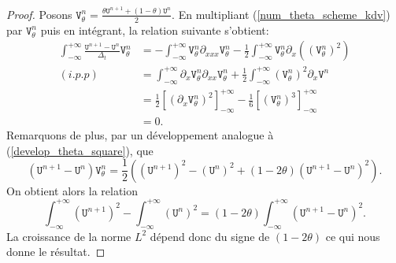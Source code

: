 \documentclass[12pt,a4paper]{article}
\numberwithin{equation}{section}
\begin{document}
\begin{proof}
    Posons $\texttt{V}_\theta^n = \frac{\theta\texttt{U}^{n+1} + (1-\theta)\texttt{U}^{n}}{2}$. En multipliant (\ref{num_theta_scheme_kdv}) par $\texttt{V}^n_\theta$ puis en intégrant, la relation suivante s'obtient:
\begin{equation*}
\begin{split}
    \int_{-\infty}^{+\infty}\frac{\texttt{U}^{n+1}-\texttt{U}^n}{\Delta_t}\texttt{V}_\theta^n
    &= -\int_{-\infty}^{+\infty} \texttt{V}_\theta^n\partial_{xxx} \texttt{V}_\theta^n  -\frac{1}{2}\int_{-\infty}^{+\infty} \texttt{V}_\theta^n\partial_{x}\left( \left(\texttt{V}_\theta^n\right)^2 \right) \\
    (i.p.p)~~&= \int_{-\infty}^{+\infty} \partial_{x}\texttt{V}_\theta^n\partial_{xx} \texttt{V}_\theta^n  + \frac{1}{2}\int_{-\infty}^{+\infty}  \left(\texttt{V}_\theta^n\right)^2\partial_{x} \texttt{V}^n  \\
    &= \frac{1}{2}\left[\left(\partial_{x}\texttt{V}_\theta^n\right)^2\right]_{-\infty}^{+\infty} -\frac{1}{6} \left[\left(\texttt{V}_\theta^n\right)^3 \right]_{-\infty}^{+\infty} \\
    & = 0 .
\end{split}
\end{equation*}
Remarquons de plus, par un développement analogue à (\ref{develop_theta_square}), que 
$$(\texttt{U}^{n+1}-\texttt{U}^n)\texttt{V}_\theta^n = \frac{1}{2}\left((\texttt{U}^{n+1})^2-(\texttt{U}^n)^2 + (1-2\theta)(\texttt{U}^{n+1}-\texttt{U}^{n})^2 \right).$$ 
On obtient alors la relation
\begin{equation}
    \int_{-\infty}^{+\infty}(\texttt{U}^{n+1})^2 - \int_{-\infty}^{+\infty}(\texttt{U}^{n})^2 = (1-2\theta) \int_{-\infty}^{+\infty}(\texttt{U}^{n+1}- \texttt{U}^{n})^2 .
\end{equation}
La croissance de la norme $L^2$ dépend donc du signe de $(1-2\theta)$ ce qui nous donne le résultat.
\end{proof}
\end{document}
